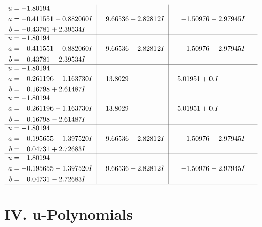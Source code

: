 \documentclass[1p]{elsarticle_modified}
\theoremstyle{definition}
\begin{document}
$$\begin{array}{c|c|c}
\begin{aligned}
u &= -1.80194\phantom{ +0.000000I} \\
a &= -0.411551 + 0.882060 I \\
b &= -0.43781 + 2.39534 I\end{aligned}
 & \phantom{-}9.66536 + 2.82812 I & -1.50976 - 2.97945 I \\ \hline\begin{aligned}
u &= -1.80194\phantom{ +0.000000I} \\
a &= -0.411551 - 0.882060 I \\
b &= -0.43781 - 2.39534 I\end{aligned}
 & \phantom{-}9.66536 - 2.82812 I & -1.50976 + 2.97945 I \\ \hline\begin{aligned}
u &= -1.80194\phantom{ +0.000000I} \\
a &= \phantom{-}0.261196 + 1.163730 I \\
b &= \phantom{-}0.16798 + 2.61487 I\end{aligned}
 & \phantom{-}13.8029\phantom{ +0.000000I} & \phantom{-}5.01951 + 0. I\phantom{ +0.000000I} \\ \hline\begin{aligned}
u &= -1.80194\phantom{ +0.000000I} \\
a &= \phantom{-}0.261196 - 1.163730 I \\
b &= \phantom{-}0.16798 - 2.61487 I\end{aligned}
 & \phantom{-}13.8029\phantom{ +0.000000I} & \phantom{-}5.01951 + 0. I\phantom{ +0.000000I} \\ \hline\begin{aligned}
u &= -1.80194\phantom{ +0.000000I} \\
a &= -0.195655 + 1.397520 I \\
b &= \phantom{-}0.04731 + 2.72683 I\end{aligned}
 & \phantom{-}9.66536 - 2.82812 I & -1.50976 + 2.97945 I \\ \hline\begin{aligned}
u &= -1.80194\phantom{ +0.000000I} \\
a &= -0.195655 - 1.397520 I \\
b &= \phantom{-}0.04731 - 2.72683 I\end{aligned}
 & \phantom{-}9.66536 + 2.82812 I & -1.50976 - 2.97945 I\\
 \hline 
 \end{array}$$\newpage
\newpage\renewcommand{\arraystretch}{1}
\centering \section*{ IV. u-Polynomials}
\end{document}

